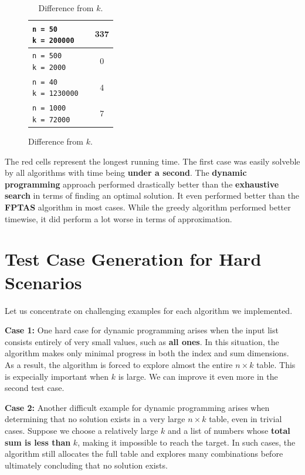 \documentclass[11pt]{article}
\begin{document}
\begin{figure}[!hbpt]
\begin{minipage}{0.35\textwidth}
\begin{table}[H]
\begin{tabular}{|l|c|c|}
                \makecell[l]{ \texttt{n = 50} \\ \texttt{k = 200000}} &  \cellcolor{red!20}{19516} & 337 \\ \hline
                \makecell[l]{ \texttt{n = 500} \\ \texttt{k = 2000}} &  \cellcolor{red!20}{34} & 0 \\ \hline
                \makecell[l]{ \texttt{n = 40} \\ \texttt{k = 1230000}} &  \cellcolor{red!20}{33687} & 4 \\ \hline
                \makecell[l]{ \texttt{n = 1000} \\ \texttt{k = 72000}} & \cellcolor{red!20}{897} & 7 \\ \hline
            \end{tabular}
            \caption{Difference from $k$.}
        \end{table} 
    \end{minipage}  
\end{figure}

The red cells represent the longest running time. The first case was easily solveble by all algorithms with time being \textbf{under a second}. The \textbf{dynamic programming} approach performed drastically better than the \textbf{exhaustive search} in terms of finding an optimal solution. It even performed better than the \textbf{FPTAS} algorithm in most cases. While the greedy algorithm performed better timewise, it did perform a lot worse in terms of approximation.

\section{Test Case Generation for Hard Scenarios}

Let us concentrate on challenging examples for each algorithm we implemented.

\textbf{Case 1:} One hard case for dynamic programming arises when the input list consists entirely of very small values, such as \textbf{all ones}. In this situation, the algorithm makes only minimal progress in both the index and sum dimensions. As a result, the algorithm is forced to explore almost the entire $n \times k$ table. This is expecially important when $k$ is large. We can improve it even more in the second test case. 

\textbf{Case 2:} Another difficult example for dynamic programming arises when determining that no solution exists in a very large $n \times k$ table, even in trivial cases. Suppose we choose a relatively large $k$ and a list of numbers whose \textbf{total sum is less than} $k$, making it impossible to reach the target. In such cases, the algorithm still allocates the full table and explores many combinations before ultimately concluding that no solution exists. 
\end{document}
